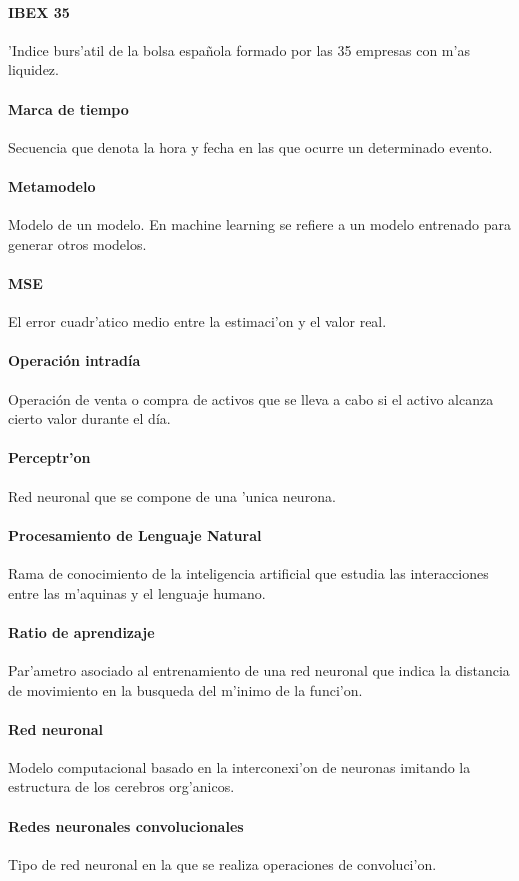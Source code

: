 \paragraph*{IBEX 35} 'Indice burs'atil de la bolsa española formado por las 35 empresas con m'as liquidez. 
\paragraph*{Marca de tiempo} Secuencia que denota la hora y fecha en las que ocurre un determinado evento.
\paragraph*{Metamodelo} Modelo de un modelo. En machine learning se refiere a un modelo entrenado para generar otros modelos.
\paragraph*{MSE} El error cuadr'atico medio entre la estimaci'on y el valor real.
\paragraph*{Operación intradía} Operación de venta o compra de activos que se lleva a cabo si el activo alcanza cierto valor durante el día.
\paragraph*{Perceptr'on} Red neuronal que se compone de una 'unica neurona.
\paragraph*{Procesamiento de Lenguaje Natural} Rama de conocimiento de la inteligencia artificial que estudia las interacciones entre las m'aquinas y el lenguaje humano.
\paragraph*{Ratio de aprendizaje} Par'ametro asociado al entrenamiento de una red neuronal que indica la distancia de movimiento en la busqueda del m'inimo de la funci'on.
\paragraph*{Red neuronal} Modelo computacional basado en la interconexi'on de neuronas imitando la estructura de los cerebros org'anicos.
\paragraph*{Redes neuronales convolucionales} Tipo de red neuronal en la que se realiza operaciones de convoluci'on.
